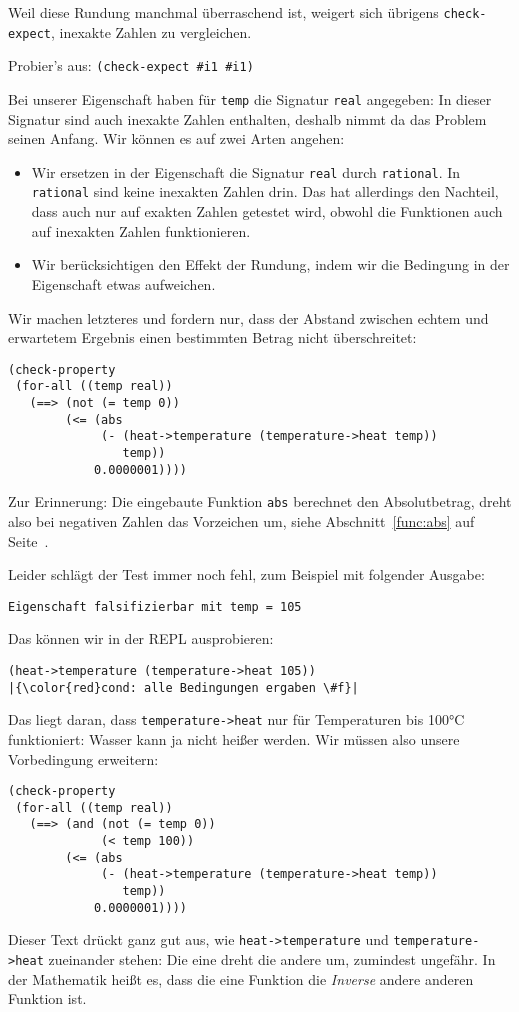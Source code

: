 Weil diese Rundung manchmal überraschend ist, weigert sich übrigens
\lstinline{check-expect}, inexakte Zahlen zu vergleichen.
%
\begin{aufgabeinline}
  Probier's aus: \lstinline{(check-expect #i1 #i1)}
\end{aufgabeinline}
%
Bei unserer Eigenschaft
haben für \lstinline{temp} die Signatur \lstinline{real} angegeben: In
dieser Signatur sind auch inexakte Zahlen enthalten, deshalb nimmt da
das Problem seinen Anfang.  Wir können es auf zwei Arten angehen:
%
\begin{itemize}
\item Wir ersetzen in der Eigenschaft die Signatur \lstinline{real}
  durch \lstinline{rational}.  In \lstinline{rational} sind keine
  inexakten Zahlen drin.  Das hat allerdings den Nachteil, dass auch
  nur auf exakten Zahlen getestet wird, obwohl die Funktionen auch auf
  inexakten Zahlen funktionieren.
\item Wir berücksichtigen den Effekt der Rundung, indem wir die Bedingung
  in der Eigenschaft etwas aufweichen.
\end{itemize}
%
Wir machen letzteres und fordern nur, dass der Abstand zwischen echtem
und erwartetem Ergebnis einen bestimmten Betrag nicht überschreitet:
%
\begin{lstlisting}
(check-property
 (for-all ((temp real))
   (==> (not (= temp 0))
        (<= (abs
             (- (heat->temperature (temperature->heat temp))
                temp))
            0.0000001))))
\end{lstlisting}
%
Zur Erinnerung: Die eingebaute Funktion \lstinline{abs} berechnet den
Absolutbetrag, dreht also bei negativen Zahlen das Vorzeichen um,
siehe Abschnitt~\ref{func:abs} auf Seite~\pageref{func:abs}.

Leider schlägt der Test immer noch fehl, zum Beispiel mit folgender
Ausgabe:
%
\begin{lstlisting}
Eigenschaft falsifizierbar mit temp = 105
\end{lstlisting}
%
Das können wir in der REPL ausprobieren:
%
\begin{lstlisting}
(heat->temperature (temperature->heat 105))
|{\color{red}cond: alle Bedingungen ergaben \#f}|
\end{lstlisting}
%
Das liegt daran, dass \lstinline{temperature->heat} nur für
Temperaturen bis 100\si{\degree}C funktioniert: Wasser kann ja nicht
heißer werden.  Wir müssen also unsere Vorbedingung erweitern:
%
\begin{lstlisting}
(check-property
 (for-all ((temp real))
   (==> (and (not (= temp 0))
             (< temp 100))
        (<= (abs
             (- (heat->temperature (temperature->heat temp))
                temp))
            0.0000001))))
\end{lstlisting}
%
Dieser Text drückt ganz gut aus, wie \lstinline{heat->temperature} und
\lstinline{temperature->heat} zueinander stehen: Die eine dreht die
andere um, zumindest ungefähr.  In der Mathematik heißt es, dass die
eine Funktion die \textit{Inverse} andere anderen Funktion
ist.

